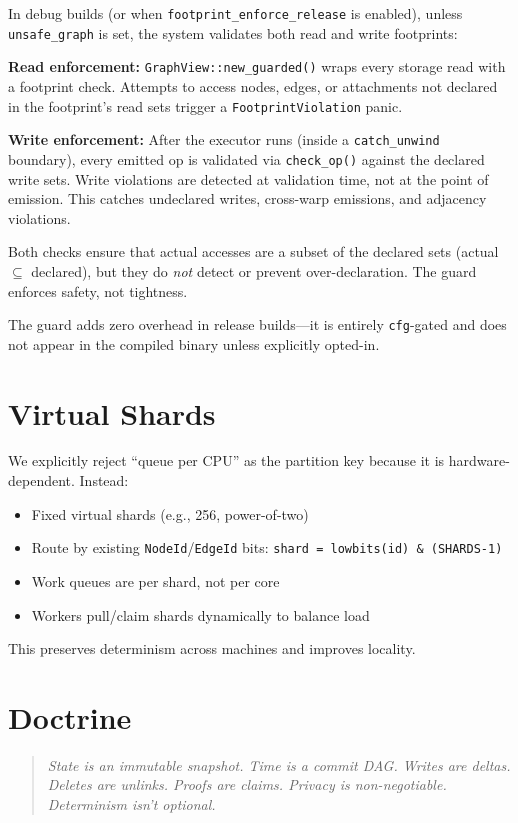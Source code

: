 In debug builds (or when \texttt{footprint\_enforce\_release} is enabled),
unless \texttt{unsafe\_graph} is set, the system validates both read and
write footprints:

\textbf{Read enforcement:} \texttt{GraphView::new\_guarded()} wraps every
storage read with a footprint check. Attempts to access nodes, edges, or
attachments not declared in the footprint's read sets trigger a
\texttt{FootprintViolation} panic.

\textbf{Write enforcement:} After the executor runs (inside a
\texttt{catch\_unwind} boundary), every emitted op is validated via
\texttt{check\_op()} against the declared write sets. Write violations are
detected at validation time, not at the point of emission. This catches
undeclared writes, cross-warp emissions, and adjacency violations.

Both checks ensure that actual accesses are a subset of the declared sets
(actual $\subseteq$ declared), but they do \emph{not} detect or prevent
over-declaration. The guard enforces safety, not tightness.

The guard adds zero overhead in release builds---it is entirely
\texttt{cfg}-gated and does not appear in the compiled binary unless
explicitly opted-in.

\section{Virtual Shards}

We explicitly reject ``queue per CPU'' as the partition key because it is hardware-dependent. Instead:

\begin{itemize}
    \item Fixed virtual shards (e.g., 256, power-of-two)
    \item Route by existing \texttt{NodeId}/\texttt{EdgeId} bits: \texttt{shard = lowbits(id) \& (SHARDS-1)}
    \item Work queues are per shard, not per core
    \item Workers pull/claim shards dynamically to balance load
\end{itemize}

This preserves determinism across machines and improves locality.

\section{Doctrine}

\begin{quote}
\itshape
State is an immutable snapshot. Time is a commit DAG. Writes are deltas. Deletes are unlinks. Proofs are claims. Privacy is non-negotiable. Determinism isn't optional.
\end{quote}
